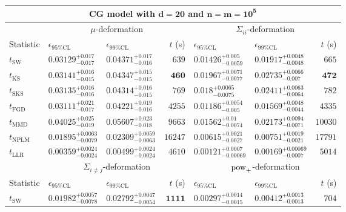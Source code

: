 \begin{tabular}{l|llr|llr}
	\toprule
	\multicolumn{7}{c}{{\bf CG model with $\mathbf{d=20}$ and $\mathbf{n=m=10^{5}}$}} \\
	\toprule
	\multicolumn{1}{c}{} & \multicolumn{3}{c}{$\mu$-deformation} & \multicolumn{3}{c}{$\Sigma_{ii}$-deformation} \\
	Statistic & $\epsilon_{95\%\mathrm{CL}}$ & $\epsilon_{99\%\mathrm{CL}}$ & $t$ (s) & $\epsilon_{95\%\mathrm{CL}}$ & $\epsilon_{99\%\mathrm{CL}}$ & $t$ (s) \\
	\midrule
	$t_{\mathrm{SW}}$ & $0.03129_{-0.017}^{+0.017}$ & $0.04371_{-0.016}^{+0.017}$ & $639$ & $0.01426_{-0.0059}^{+0.005}$ & $0.01917_{-0.0048}^{+0.0048}$ & $665$ \\
	$t_{\overline{\mathrm{KS}}}$ & $0.03141_{-0.015}^{+0.016}$ & $0.04347_{-0.015}^{+0.015}$ & ${\mathbf{460}}$ & $0.01967_{-0.0077}^{+0.0071}$ & $0.02735_{-0.007}^{+0.0066}$ & ${\mathbf{472}}$ \\
	$t_{\mathrm{SKS}}$ & $0.03135_{-0.016}^{+0.016}$ & $0.04314_{-0.015}^{+0.016}$ & $769$ & $0.018_{-0.0075}^{+0.0065}$ & $0.02411_{-0.0064}^{+0.0063}$ & $782$ \\
	$t_{\mathrm{FGD}}$ & ${\mathbf{0.03111_{-0.017}^{+0.021}}}$ & ${\mathbf{0.04221_{-0.016}^{+0.019}}}$ & $4255$ & ${\mathbf{0.01186_{-0.005}^{+0.0054}}}$ & ${\mathbf{0.01569_{-0.0044}^{+0.0048}}}$ & $4335$ \\
	$t_{\mathrm{MMD}}$ & $0.04025_{-0.019}^{+0.025}$ & $0.05607_{-0.018}^{+0.023}$ & $9663$ & $0.01562_{-0.0074}^{+0.01}$ & $0.02173_{-0.0071}^{+0.0094}$ & $10030$ \\
\rowcolor{red!35}	$t_{\mathrm{NPLM}}$ & $0.01895_{-0.0079}^{+0.0063}$ & $0.02309_{-0.0063}^{+0.0059}$ & $16247$ & $0.00615_{-0.0027}^{+0.0021}$ & $0.00751_{-0.0021}^{+0.0019}$ & $17791$ \\
	$t_{\mathrm{LLR}}$ & $0.00359_{-0.0024}^{+0.0024}$ & $0.00499_{-0.0024}^{+0.0024}$ & $4610$ & $0.00121_{-0.00069}^{+0.0007}$ & $0.00169_{-0.0007}^{+0.00069}$ & $5014$ \\
	\toprule
	\multicolumn{1}{c}{} & \multicolumn{3}{c}{$\Sigma_{i\neq j}$-deformation} & \multicolumn{3}{c}{$\rm{pow}_{+}$-deformation} \\
	Statistic & $\epsilon_{95\%\mathrm{CL}}$ & $\epsilon_{99\%\mathrm{CL}}$ & $t$ (s) & $\epsilon_{95\%\mathrm{CL}}$ & $\epsilon_{99\%\mathrm{CL}}$ & $t$ (s) \\
	\midrule
	$t_{\mathrm{SW}}$ & $0.01982_{-0.0078}^{+0.0057}$ & $0.02792_{-0.0054}^{+0.0047}$ & ${\mathbf{1111}}$ & $0.00297_{-0.0015}^{+0.0014}$ & $0.00412_{-0.0013}^{+0.0013}$ & $704$ \\

\end{tabular}
